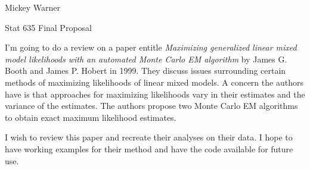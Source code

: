 \documentclass[12pt]{article}
\begin{document}
\noindent Mickey Warner
\bigskip

\noindent Stat 635 Final Proposal
\bigskip

\noindent I'm going to do a review on a paper entitle \emph{Maximizing generalized linear mixed model likelihoods with an automated Monte Carlo EM algorithm} by James G. Booth and James P. Hobert in 1999. They discuss issues surrounding certain methods of maximizing likelihoods of linear mixed models. A concern the authors have is that approaches for maximizing likelihoods vary in their estimates and the variance of the estimates. The authors propose two Monte Carlo EM algorithms to obtain exact maximum likelihood estimates.
\bigskip

\noindent I wish to review this paper and recreate their analyses on their data. I hope to have working examples for their method and have the code available for future use.
\end{document}
